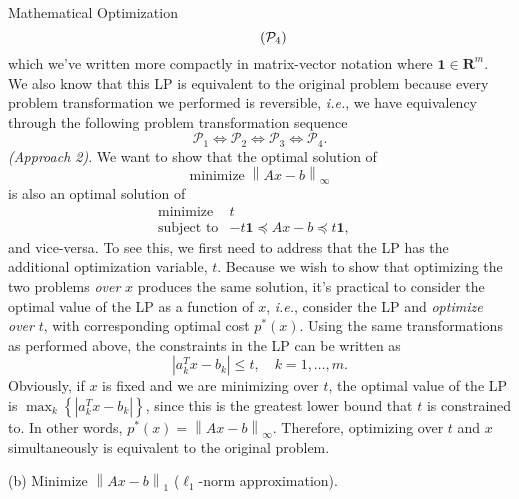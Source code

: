\begin{chapter}{Mathematical Optimization}
\begin{equation}
\begin{array}{lll}
            \end{array}
            \tag{$\mathcal{P}_4$}
            \label{eq:P4}
    \end{equation}
    which we've written more compactly in matrix-vector notation where $\bm{1} \in \mathbf{R}^m$.
    We also know that this LP is equivalent to the original problem because every problem transformation
    we performed is reversible, \textit{i.e.}, we have equivalency through the following problem transformation
    sequence
    \[\mathcal{P}_1 \Longleftrightarrow \mathcal{P}_2 \Longleftrightarrow \mathcal{P}_3 \Longleftrightarrow \mathcal{P}_4.\]
    \noindent \textit{(Approach 2)}. We want to show that the optimal solution of
    \[\text{minimize} \; \left\lVert Ax - b \right\rVert_{\infty}\]
    is also an optimal solution of 
    \[\begin{array}{lll}
        \text{minimize} \; & t & \\
        \text{subject to} & -t \bm{1} \preceq Ax - b \preceq t \bm{1},
        \end{array}\]
    and vice-versa. To see this, we first need to address that the LP
    has the additional optimization variable, $t$. Because we wish to show
    that optimizing the two problems \textit{over} $x$ produces the same solution,
    it's practical to consider the optimal value of the LP as a function of $x$, \textit{i.e.},
    consider the LP and \textit{optimize over} $t$, with corresponding optimal cost $p^*(x)$. 
    Using the same transformations as performed above, the constraints in the LP can be written as
    \[\left| a_k^Tx - b_k \right| \le t, \quad k = 1, \ldots, m.\]
    Obviously, if $x$ is fixed and we are minimizing over $t$, the optimal value of the LP is
    $\max_k \left\{ \left| a_k^Tx - b_k \right| \right\}$, since this is the greatest lower bound that
    $t$ is constrained to. In other words, $p^*(x) = \left\lVert Ax - b \right\rVert_{\infty}$.
    Therefore, optimizing over $t$ and $x$ simultaneously is equivalent to the original problem.
    
    \vspace{0.3cm}
    \noindent (b) Minimize $\left\lVert Ax - b \right\rVert_{1}$ ($\ell_1$-norm approximation).
    

\end{chapter}
